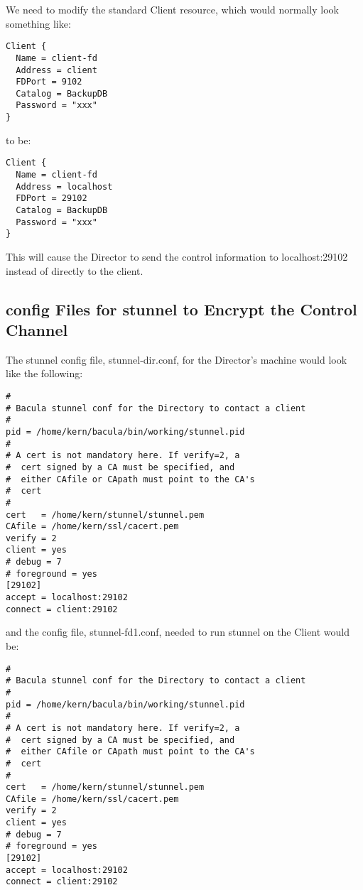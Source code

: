 We need to modify the standard Client resource, which would normally look
something like: 

\footnotesize
\begin{verbatim}
Client {
  Name = client-fd
  Address = client
  FDPort = 9102
  Catalog = BackupDB
  Password = "xxx"
}
\end{verbatim}
\normalsize

to be: 

\footnotesize
\begin{verbatim}
Client {
  Name = client-fd
  Address = localhost
  FDPort = 29102
  Catalog = BackupDB
  Password = "xxx"
}
\end{verbatim}
\normalsize

This will cause the Director to send the control information to
localhost:29102 instead of directly to the client. 

\subsection*{config Files for stunnel to Encrypt the Control Channel}

The stunnel config file, stunnel-dir.conf, for the Director's machine would
look like the following: 

\footnotesize
\begin{verbatim}
#
# Bacula stunnel conf for the Directory to contact a client
#
pid = /home/kern/bacula/bin/working/stunnel.pid
#
# A cert is not mandatory here. If verify=2, a
#  cert signed by a CA must be specified, and
#  either CAfile or CApath must point to the CA's
#  cert
#
cert   = /home/kern/stunnel/stunnel.pem
CAfile = /home/kern/ssl/cacert.pem
verify = 2
client = yes
# debug = 7
# foreground = yes
[29102]
accept = localhost:29102
connect = client:29102
\end{verbatim}
\normalsize

and the config file, stunnel-fd1.conf, needed to run stunnel on the Client
would be: 

\footnotesize
\begin{verbatim}
#
# Bacula stunnel conf for the Directory to contact a client
#
pid = /home/kern/bacula/bin/working/stunnel.pid
#
# A cert is not mandatory here. If verify=2, a
#  cert signed by a CA must be specified, and
#  either CAfile or CApath must point to the CA's
#  cert
#
cert   = /home/kern/stunnel/stunnel.pem
CAfile = /home/kern/ssl/cacert.pem
verify = 2
client = yes
# debug = 7
# foreground = yes
[29102]
accept = localhost:29102
connect = client:29102
\end{verbatim}
\normalsize


